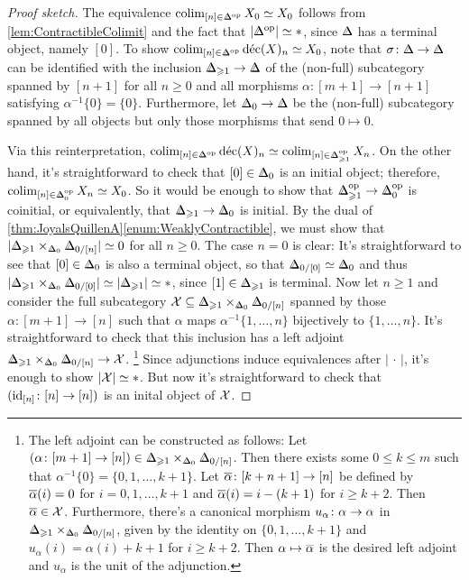 \begin{proof}[Proof sketch]
	The equivalence $\colimit_{[n]\in\IDelta^\op}X_0\simeq X_0$ follows from \cref{lem:ContractibleColimit} and the fact that $\left|\IDelta^\op\right|\simeq *$, since $\IDelta$ has a terminal object, namely $[0]$. To show $\colimit_{[n]\in\IDelta^\op}\operatorname{d\acute{e}c}(X)_n\simeq X_0$, note that $\sigma\colon \IDelta\rightarrow \IDelta$ can be identified with the inclusion $\IDelta_{\geqslant 1}\rightarrow\IDelta$ of the (non-full) subcategory spanned by $[n+1]$ for all $n\geqslant 0$ and all morphisms $\alpha\colon [m+1]\rightarrow [n+1]$ satisfying $\alpha^{-1}\{0\}=\{0\}$. Furthermore, let $\IDelta_0\rightarrow \IDelta$ be the (non-full) subcategory spanned by all objects but only those morphisms that send $0\mapsto 0$.
	
	Via this reinterpretation, $\colimit_{[n]\in\IDelta^\op}\operatorname{d\acute{e}c}(X)_n\simeq \colimit_{[n]\in\IDelta_{\geqslant 1}^\op}X_n$.
	On the other hand, it's straightforward to check that $[0]\in \IDelta_0$ is an initial object; therefore, $\colimit_{[n]\in \IDelta_0^\op}X_n\simeq X_0$. So it would be enough to show that $\IDelta_{\geqslant 1}^\op\rightarrow \IDelta_0^\op$ is coinitial, or equivalently, that $\IDelta_{\geqslant 1}\rightarrow \IDelta_0$ is initial. By the dual of \cref{thm:JoyalsQuillenA}\cref{enum:WeaklyContractible}, we must show that $\mathopen|\IDelta_{\geqslant 1}\times_{\IDelta_0}\IDelta_{0/[n]}\mathclose|\simeq 0$ for all $n\geqslant 0$. The case $n=0$ is clear: It's straightforward to see that $[0]\in \IDelta_{0}$ is also a terminal object, so that $\IDelta_{0/[0]}\simeq \IDelta_0$ and thus $\mathopen|\IDelta_{\geqslant 1}\times_{\IDelta_0}\IDelta_{0/[0]}\mathclose|\simeq \mathopen|\IDelta_{\geqslant 1}\mathclose|\simeq *$, since $[1]\in \IDelta_{\geqslant 1}$ is terminal. Now let $n\geqslant 1$ and consider the full subcategory $\Xx\subseteq \IDelta_{\geqslant 1}\times_{\IDelta_0}\IDelta_{0/[n]}$ spanned by those $\alpha\colon [m+1]\rightarrow [n]$ such that $\alpha$ maps $\alpha^{-1}\{1,\dotsc,n\}$ bijectively to $\{1,\dotsc,n\}$. It's straightforward to check that this inclusion has a left adjoint $\IDelta_{\geqslant 1}\times_{\IDelta_0}\IDelta_{0/[n]}\rightarrow \Xx$.%
	\footnote{The left adjoint can be constructed as follows: Let $(\alpha\colon [m+1]\rightarrow [n])\in \IDelta_{\geqslant 1}\times_{\IDelta_0}\IDelta_{0/[n]}$. Then there exists some $0\leqslant k\leqslant m$ such that $\alpha^{-1}\{0\}=\{0,1,\dotsc,k+1\}$. Let $\ov\alpha\colon [k+n+1]\rightarrow[n]$ be defined by $\ov\alpha(i)=0$ for $i=0,1,\dotsc,k+1$ and $\ov\alpha(i)=i-(k+1)$ for $i\geqslant k+2$. Then $\ov\alpha\in \Xx$. Furthermore, there's a canonical morphism $u_\alpha\colon \alpha\rightarrow \ov\alpha$ in $\IDelta_{\geqslant 1}\times_{\IDelta_0}\IDelta_{0/[n]}$, given by the identity on $\{0,1,\dotsc,k+1\}$ and $u_\alpha(i)=\alpha(i)+k+1$ for $i\geqslant k+2$. Then $\alpha\mapsto \ov\alpha$ is the desired left adjoint and $u_\alpha$ is the unit of the adjunction.}
	Since adjunctions induce equivalences after $\left|\,\cdot\,\right|$, it's enough to show $\left|\Xx\right|\simeq *$. But now it's straightforward to check that $(\operatorname{id}_{[n]}\colon [n]\rightarrow [n])$ is an inital object of $\mathcal{X}$.
\end{proof}
